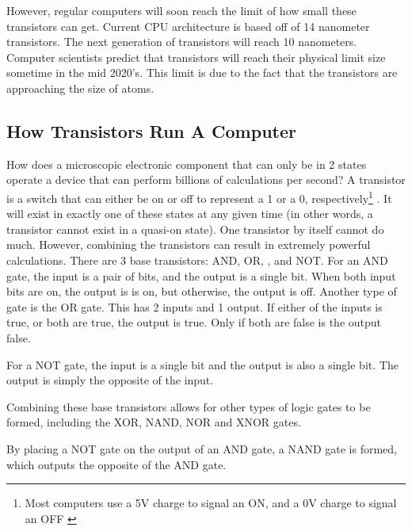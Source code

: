\documentclass[10pt,journal,compsoc]{IEEEtran}
\begin{document}
However, regular computers will soon reach the limit of how small these transistors can get. Current CPU architecture is based off of 14 nanometer transistors. The next generation of transistors will reach 10 nanometers. \cite{Intel}
 Computer scientists predict that transistors will reach their physical limit size sometime in the mid 2020's. This limit is due to the fact that the transistors are approaching the size of atoms\cite{ARSTech}.


\subsection{How Transistors Run A Computer}
How does a microscopic electronic component that can only be in 2 states operate a device that can perform billions of calculations per second? A transistor is a switch that can either be on or off to represent a 1 or a 0, respectively\footnote{Most computers use a 5V charge to signal an ON, and a 0V charge to signal an OFF \cite{Surrey}
	}
. It will exist in exactly one of these states at any given time (in other words, a transistor cannot exist in a quasi-on state). One transistor by itself cannot do much. However, combining the transistors can result in extremely powerful calculations. There are 3 base transistors: AND, OR, , and NOT.  For an AND gate, the input is a pair of bits, and the output is a single bit. When both input bits are on, the output is is on, but otherwise, the output is off. Another type of gate is the OR gate. This has 2 inputs and 1 output. If either of the inputs is true, or both are true, the output is true. Only if both are false is the output false. 

For a NOT gate, the input is a single bit and the output is also a single bit. The output is simply the opposite of the input. 

Combining these base transistors allows for other types of logic gates to be formed, including the XOR, NAND, NOR and XNOR gates.

 By placing a NOT gate on the output of an AND gate, a NAND gate is formed, which outputs the opposite of the AND gate. 
\end{document}
